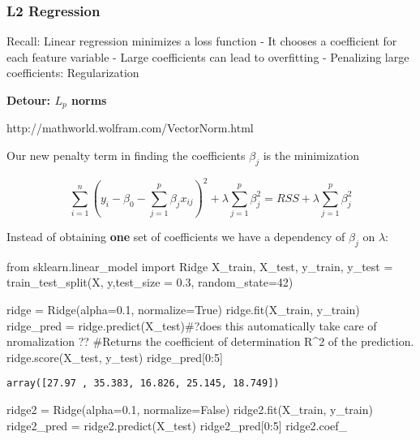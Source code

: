 \documentclass[
  letterpaper,
  DIV=11,
  numbers=noendperiod]{scrreprt}
\newenvironment{Shaded}{\begin{snugshade}}{\end{snugshade}}
\newcommand{\CommentTok}[1]{\textcolor[rgb]{0.37,0.37,0.37}{#1}}
\newcommand{\DecValTok}[1]{\textcolor[rgb]{0.68,0.00,0.00}{#1}}
\newcommand{\FloatTok}[1]{\textcolor[rgb]{0.68,0.00,0.00}{#1}}
\newcommand{\ImportTok}[1]{\textcolor[rgb]{0.00,0.46,0.62}{#1}}
\newcommand{\NormalTok}[1]{\textcolor[rgb]{0.00,0.23,0.31}{#1}}
\newcommand{\OperatorTok}[1]{\textcolor[rgb]{0.37,0.37,0.37}{#1}}
\newcommand{\VariableTok}[1]{\textcolor[rgb]{0.07,0.07,0.07}{#1}}
\begin{document}
\hypertarget{l2-regression}{%
\subsubsection{L2 Regression}\label{l2-regression}}

Recall: Linear regression minimizes a loss function - It chooses a
coefficient for each feature variable - Large coefficients can lead to
overfitting - Penalizing large coefficients: Regularization

\textbf{Detour: \(L_p\) norms}

http://mathworld.wolfram.com/VectorNorm.html

Our new penalty term in finding the coefficients \(\beta_j\) is the
minimization

\[
\sum_{i=1}^n{\left( y_i - \beta_0 - \sum_{j=1}^p{\beta_j x_{ij}} \right)^2} + \lambda \sum_{j=1}^p{\beta_j^2} = RSS + \lambda \sum_{j=1}^p{\beta_j^2}
\]

Instead of obtaining \textbf{one} set of coefficients we have a
dependency of \(\beta_j\) on \(\lambda\):

\begin{Shaded}
\begin{Highlighting}[]
\ImportTok{from}\NormalTok{ sklearn.linear\_model }\ImportTok{import}\NormalTok{ Ridge}
\NormalTok{X\_train, X\_test, y\_train, y\_test }\OperatorTok{=}\NormalTok{ train\_test\_split(X, y,test\_size }\OperatorTok{=} \FloatTok{0.3}\NormalTok{, random\_state}\OperatorTok{=}\DecValTok{42}\NormalTok{)}

\NormalTok{ridge }\OperatorTok{=}\NormalTok{ Ridge(alpha}\OperatorTok{=}\FloatTok{0.1}\NormalTok{, normalize}\OperatorTok{=}\VariableTok{True}\NormalTok{)}
\NormalTok{ridge.fit(X\_train, y\_train)}
\NormalTok{ridge\_pred }\OperatorTok{=}\NormalTok{ ridge.predict(X\_test)}\CommentTok{\#?does this automatically take care of nromalization ??}
\CommentTok{\#Returns the coefficient of determination R\^{}2 of the prediction.}
\NormalTok{ridge.score(X\_test, y\_test)}
\NormalTok{ridge\_pred[}\DecValTok{0}\NormalTok{:}\DecValTok{5}\NormalTok{]}
\end{Highlighting}
\end{Shaded}

\begin{verbatim}
array([27.97 , 35.383, 16.826, 25.145, 18.749])
\end{verbatim}

\begin{Shaded}
\begin{Highlighting}[]
\NormalTok{ridge2 }\OperatorTok{=}\NormalTok{ Ridge(alpha}\OperatorTok{=}\FloatTok{0.1}\NormalTok{, normalize}\OperatorTok{=}\VariableTok{False}\NormalTok{)}
\NormalTok{ridge2.fit(X\_train, y\_train)}
\NormalTok{ridge2\_pred }\OperatorTok{=}\NormalTok{ ridge2.predict(X\_test)}
\NormalTok{ridge2\_pred[}\DecValTok{0}\NormalTok{:}\DecValTok{5}\NormalTok{]}
\NormalTok{ridge2.coef\_}
\end{Highlighting}
\end{Shaded}
\end{document}
